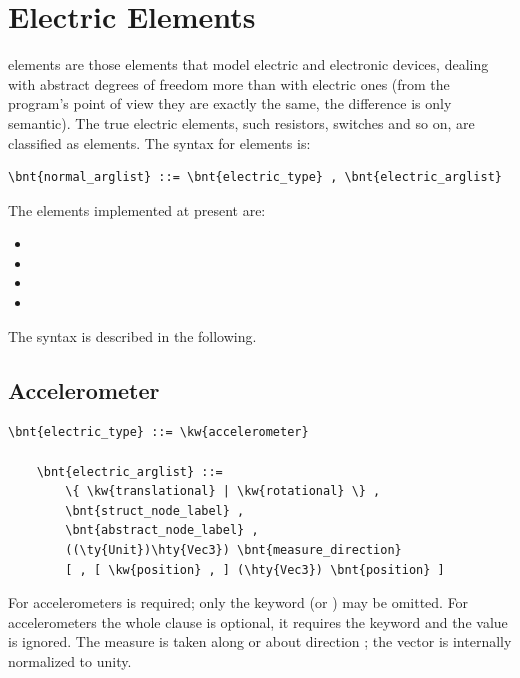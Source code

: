 \section{Electric Elements}
 elements are those elements that model electric and electronic
devices, dealing with abstract degrees of freedom more than with electric
ones (from the program's point of view they are exactly the same, the
difference is only semantic). The true electric elements, such resistors,
switches and so on, are classified as  elements.
The syntax for  elements is:
\begin{Verbatim}[commandchars=\\\{\}]
    \bnt{normal_arglist} ::= \bnt{electric_type} , \bnt{electric_arglist}
\end{Verbatim}
The  elements implemented at present are:
\begin{itemize}
	\item {}
	\item {}
	\item {}
	\item {}
\end{itemize}
The syntax is described in the following.

\subsection{Accelerometer}
\begin{Verbatim}[commandchars=\\\{\}]
    \bnt{electric_type} ::= \kw{accelerometer}

    \bnt{electric_arglist} ::=
        \{ \kw{translational} | \kw{rotational} \} ,
        \bnt{struct_node_label} ,
        \bnt{abstract_node_label} ,
        ((\ty{Unit})\hty{Vec3}) \bnt{measure_direction}
        [ , [ \kw{position} , ] (\hty{Vec3}) \bnt{position} ]
\end{Verbatim}
For  accelerometers  is required;
only the keyword  (or ) may be omitted.
For  accelerometers the whole clause is optional,
it requires the keyword and the value is ignored.
The measure is taken along or about direction ;
the vector is internally normalized to unity.

